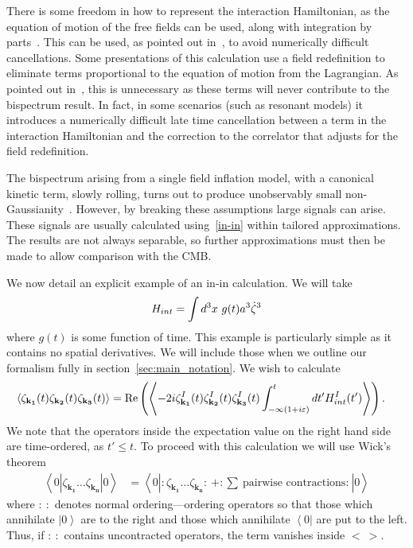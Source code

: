 There is some freedom in how to represent the interaction Hamiltonian,
as the equation of motion of the free fields can be used, along with integration by parts~\cite{rp_integ_by_parts}.
This can be used, as pointed out in~\cite{Funakoshi}, to avoid numerically difficult cancellations.
Some presentations of this calculation use a field redefinition to eliminate terms
proportional to the equation of motion from the Lagrangian.
As pointed out in~\cite{px_burrage},
this is unnecessary as these terms will never contribute to the bispectrum result.
In fact, in some scenarios (such as resonant models) it introduces a numerically difficult
late time cancellation between a term in the interaction Hamiltonian and the
correction to the correlator that adjusts for the field redefinition.


The bispectrum arising from a single field inflation model,
with a canonical kinetic term, slowly rolling, turns out to produce
unobservably small non-Gaussianity~\cite{Maldacena}.
However, by breaking these assumptions large signals can arise.
These signals are usually calculated using~\eqref{in-in} within tailored approximations.
The results are not always separable, so further approximations must then be made to
allow comparison with the CMB.


We now detail an explicit example of an in-in calculation.
We will take
\begin{align}\label{hint_example}
    H_{int}=\int d^3x~g(t) a^3\dot{\zeta}^3
\end{align}
where $g(t)$ is some function of time.
This example is particularly simple as it contains no spatial derivatives.
We will include those when we outline our formalism fully in section~\ref{sec:main_notation}.
We wish to calculate
\begin{align}\label{inin_example}
    \left<\zeta_{\mathbf{k_1}}(t)\zeta_{\mathbf{k_2}}(t)\zeta_{\mathbf{k_3}}(t)\right>&=
    \operatorname{Re}\left(\left<-2i \zeta^I_{\mathbf{k_1}}(t)\zeta^I_{\mathbf{k_2}}(t)\zeta^I_{\mathbf{k_3}}(t)
    \int_{-\infty(1+i\varepsilon)}^{t}dt'H_{int}^I(t')
    \right>\right).
\end{align}
We note that the operators inside the expectation value on the right hand side are
time-ordered, as $t'\leq t$.
To proceed with this calculation we will use Wick's theorem
\begin{align}\label{wick}
    \left<0\left|\zeta_{\mathbf{k_1}}\ldots\zeta_{\mathbf{k_n}}\right|0\right>
    &= \left<0\left|:\zeta_{\mathbf{k_1}}\ldots\zeta_{\mathbf{k_n}}:~+:\sum~\text{pairwise contractions:}~\right|0\right>
\end{align}
where $:~:$ denotes normal ordering---ordering operators so that those
which annihilate $\left|0\right>$ are to the right and those which annihilate
$\left<0\right|$ are put to the left. Thus, if $:~:$ contains uncontracted
operators, the term vanishes inside $<~>$.



